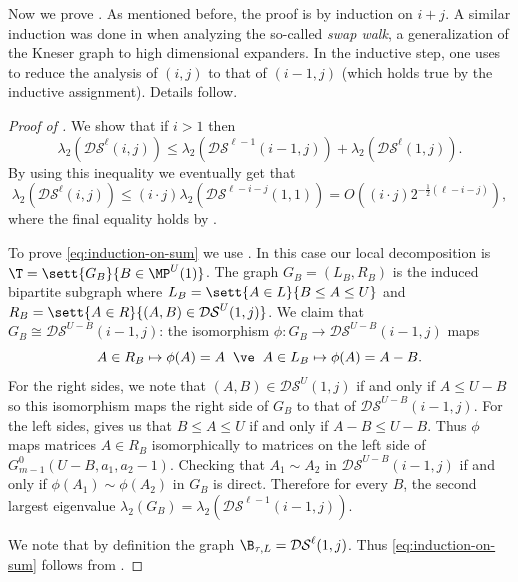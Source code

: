 Now we prove . As mentioned before, the proof is by induction on \(i+j\). A similar induction was done in \cite{DiksteinD2019} when analyzing the so-called \emph{swap walk}, a generalization of the Kneser graph to high dimensional expanders. In the inductive step, one uses  to reduce the analysis of \((i,j)\) to that of \((i-1,j)\) (which holds true by the inductive assignment). Details follow.
\begin{proof}[Proof of ]
    We show that if \(i > 1\) then 
    \begin{equation} \label{eq:induction-on-sum}
        \lambda_2(\mathcal{DS}^\ell(i,j)) \leq \lambda_2(\mathcal{DS}^{\ell-1}(i-1,j)) + \lambda_2(\mathcal{DS}^{\ell}(1,j)).
    \end{equation}
    By using this inequality we eventually get that
    \[\lambda_2(\mathcal{DS}^\ell(i,j)) \leq (i\cdot j)\lambda_2(\mathcal{DS}^{\ell-i-j}(1,1)) = O \left ((i\cdot j)2^{-\frac{1}{2}(\ell-i-j) }\right ),\]
    where the final equality holds by .

    To prove \eqref{eq:induction-on-sum} we use . In this case our local decomposition is \(\T = \sett{G_{B}}{B \in \MP^U(1)}\). The graph \(G_B=(L_B,R_B)\) is the induced bipartite subgraph where \(L_B = \sett{A \in L}{B \leq A \leq U}\) and \(R_B = \sett{A \in R}{(A,B) \in \mathcal{DS}^{U}(1,j)}\).   We claim that \(G_B \cong \mathcal{DS}^{U-B}(i-1,j)\): the isomorphism \(\phi : G_B \to \mathcal{DS}^{U-B}(i-1,j)\) maps \[A \in R_B \mapsto \phi(A)=A \; \; \ve \; \; A \in L_B \mapsto \phi(A)=A-B.\] 
    For the right sides, we note that \((A,B) \in \mathcal{DS}^{U}(1,j)\) if and only if \(A \leq U - B\) so this isomorphism maps the right side of \(G_B\) to that of \(\mathcal{DS}^{U-B}(i-1,j)\). For the left sides,  gives us that \(B \leq A \leq U\) if and only if \(A-B \leq U-B\). Thus \(\phi\) maps matrices \(A \in R_B\) isomorphically to matrices on the left side of \(G^0_{m-1}(U-B,a_1,a_2-1)\). Checking that \(A_1 \sim A_2\) in $\mathcal{DS}^{U-B}(i-1,j)$ if and only if \(\phi(A_1) \sim \phi(A_2)\) in \(G_B\) is direct. Therefore for every \(B\), the second largest eigenvalue \(\lambda_2(G_B) = \lambda_2(\mathcal{DS}^{\ell-1}(i-1,j))\). 

    We note that by definition the graph \(\B_{\tau,L} = \mathcal{DS}^{\ell}(1,j)\). Thus \eqref{eq:induction-on-sum} follows from .
\end{proof}

